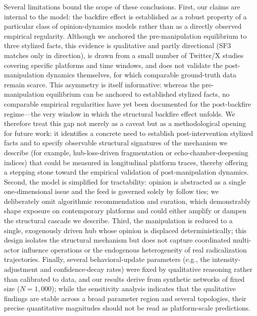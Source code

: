 \documentclass[pdflatex,sn-mathphys-num]{sn-jnl}%
\theoremstyle{thmstyleone}%
\theoremstyle{thmstyletwo}%
\theoremstyle{thmstylethree}%
\begin{document}
Several limitations bound the scope of these conclusions. First, our claims are
internal to the model: the backfire effect is established as a robust property of
a particular class of opinion-dynamics models rather than as a directly observed
empirical regularity. Although we anchored the pre-manipulation equilibrium to
three stylized facts, this evidence is qualitative and partly directional (SF3
matches only in direction), is drawn from a small number of Twitter/X studies
covering specific platforms and time windows, and does not validate the
post-manipulation dynamics themselves, for which comparable ground-truth data
remain scarce. This asymmetry is itself informative: whereas the pre-manipulation
equilibrium can be anchored to established stylized facts, no comparable empirical
regularities have yet been documented for the post-backfire regime---the very
window in which the structural backfire effect unfolds. We therefore treat this gap
not merely as a caveat but as a methodological opening for future work: it
identifies a concrete need to establish post-intervention stylized facts and to
specify observable structural signatures of the mechanism we describe (for example,
hub-loss-driven fragmentation or echo-chamber-deepening indices) that could be
measured in longitudinal platform traces, thereby offering a stepping stone toward
the empirical validation of post-manipulation dynamics. Second, the model is
simplified for tractability:
opinion is abstracted as a single one-dimensional issue and
the feed is governed solely by follow ties; we deliberately omit algorithmic
recommendation and curation, which demonstrably shape exposure on contemporary
platforms and could either amplify or dampen the structural cascade we describe.
Third, the manipulation is reduced to a single, exogenously driven hub whose
opinion is displaced deterministically; this design isolates the structural
mechanism but does not capture coordinated multi-actor influence operations or the
endogenous heterogeneity of real radicalization trajectories. Finally, several
behavioral-update parameters (e.g., the intensity-adjustment and confidence-decay
rates) were fixed by qualitative reasoning rather than calibrated to data, and our
results derive from synthetic networks of fixed size ($N = 1{,}000$); while the
sensitivity analysis indicates that the qualitative findings are stable across a
broad parameter region and several topologies, their precise quantitative
magnitudes should not be read as platform-scale predictions.
\par
\end{document}
